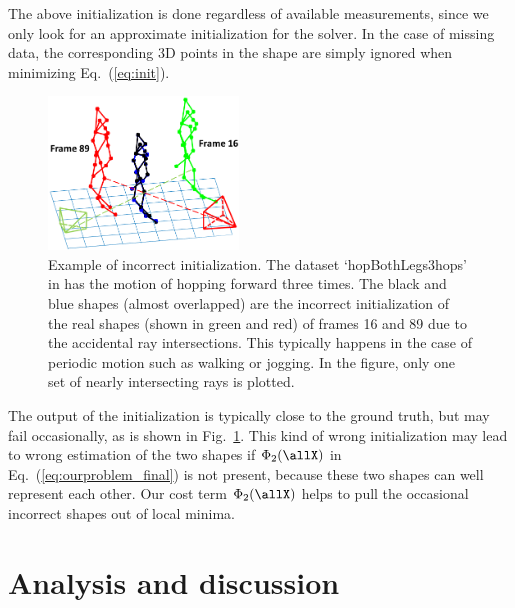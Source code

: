 The above initialization is done regardless of available measurements, since we only look for an approximate initialization for the solver. In the case of missing data, the corresponding 3D points in the shape are simply ignored when minimizing Eq.~(\ref{eq:init}).

\begin{figure}[t]
\centering
\includegraphics[width=0.45\textwidth]{chapter5/resource/wrong_init.pdf}
\caption{Example of incorrect initialization. The dataset `hopBothLegs3hops' in \cite{cg-2007-2} has the motion of hopping forward three times. The black and blue shapes (almost overlapped) are the incorrect initialization of the real shapes (shown in green and red) of frames 16 and 89 due to the accidental ray intersections. This typically happens in the case of  periodic motion such as walking or jogging. In the figure, only one set of nearly intersecting rays is plotted.}
\label{fig:init}
\end{figure}

The output of the initialization is typically close to the ground truth, but may fail occasionally, as is shown in Fig.~\ref{fig:init}. This kind of wrong initialization may lead to wrong estimation of the two shapes if $\Phi_2(\allX)$ in Eq.~(\ref{eq:ourproblem_final}) is not present, because these two shapes can well represent each other. Our cost term $\Phi_2(\allX)$ helps to pull the occasional incorrect shapes out of local minima.



\section{Analysis and discussion}	\label{sec:reconstructability}


